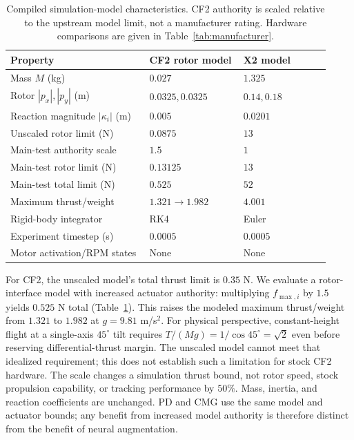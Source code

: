 \documentclass[letterpaper,10pt,conference]{IEEEtran}
\begin{document}
\begin{table}[!ht]
\centering
\caption{Compiled simulation-model characteristics. CF2 authority is
scaled relative to the upstream model limit, not a manufacturer rating.
Hardware comparisons are given in Table~\ref{tab:manufacturer}.}
\label{tab:models}
\setlength{\tabcolsep}{3pt}
\footnotesize
\begin{tabular}{@{}p{0.40\linewidth}p{0.27\linewidth}p{0.25\linewidth}@{}}
\toprule
Property & CF2 rotor model & X2 model\\
\midrule
Mass $M$ (kg) & $0.027$ & $1.325$\\
Rotor $|p_x|,|p_y|$ (m) & $0.0325,0.0325$ & $0.14,0.18$\\
Reaction magnitude $|\kappa_i|$ (m) & $0.005$ & $0.0201$\\
Unscaled rotor limit (N) & $0.0875$ & $13$\\
Main-test authority scale & $1.5$ & $1$\\
Main-test rotor limit (N) & $0.13125$ & $13$\\
Main-test total limit (N) & $0.525$ & $52$\\
Maximum thrust/weight & $1.321\to1.982$ & $4.001$\\
Rigid-body integrator & RK4 & Euler\\
Experiment timestep (s) & $0.0005$ & $0.0005$\\
Motor activation/RPM states & None & None\\
\bottomrule
\end{tabular}
\end{table}

For CF2, the unscaled model's total thrust limit is $0.35$ N. We evaluate
a rotor-interface model with increased actuator authority: multiplying
$f_{\max,i}$ by $1.5$ yields $0.525$ N total
(Table~\ref{tab:models}). This raises the modeled maximum thrust/weight
from $1.321$ to $1.982$ at $g=9.81$ m/s$^2$. For physical perspective,
constant-height flight at a single-axis $45^\circ$ tilt requires
$T/(Mg)=1/\cos45^\circ=\sqrt{2}$ even before reserving differential-thrust
margin. The unscaled model cannot meet that idealized requirement; this
does not establish such a limitation for stock CF2 hardware. The scale
changes a simulation thrust bound, not rotor speed, stock propulsion
capability, or tracking performance by $50\%$. Mass, inertia, and reaction
coefficients are unchanged. PD and CMG use the same model and actuator
bounds; any benefit from increased model authority is therefore distinct
from the benefit of neural augmentation.
\end{document}
